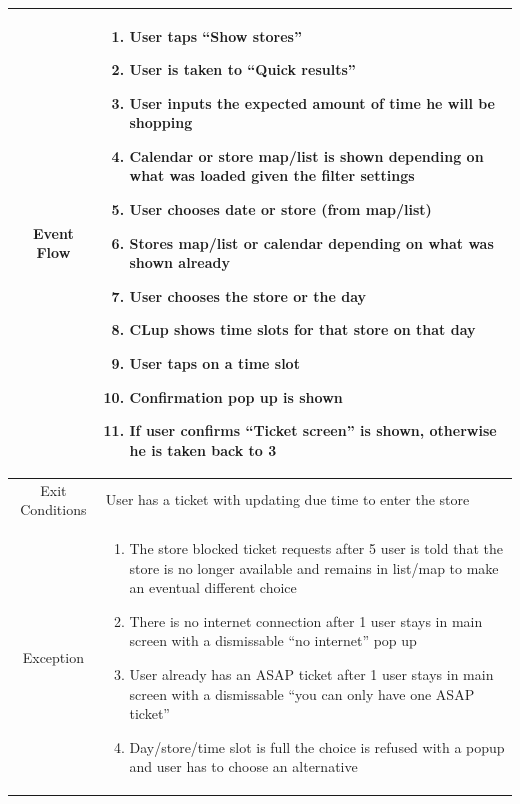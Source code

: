 \begin{enumerate}
\begin{table}[H]
{\begin{tabular}{|c|p{14cm}|}
		Event Flow & \begin{enumerate}
			\item User taps “Show stores”
			\item User is taken to “Quick results”
			\item User inputs the expected amount of time he will be shopping
			\item Calendar or store map/list is shown depending on what was loaded given the filter settings
			\item User chooses date or store (from map/list) 
			\item Stores map/list or calendar depending on what was shown already
			\item User chooses the store or the day
			\item CLup shows time slots for that store on that day
			\item User taps on a time slot
			\item Confirmation pop up is shown
			\item If user confirms “Ticket screen” is shown, otherwise he is taken back to 3			
		\end{enumerate}\\
		
		\hline
		Exit Conditions & User has a ticket with updating due time to enter the store\\
		\hline
		
		Exception & \begin{enumerate}
			\item The store blocked ticket requests\newline
			after 5 user is told that the store is no longer available and remains in list/map to make an eventual different choice
			
			\item There is no internet connection\newline
			after 1 user stays in main screen with a dismissable “no internet” pop up
			
			\item User already has an ASAP ticket\newline
			after 1 user stays in main screen with a dismissable “you can only have one ASAP ticket”
			
			\item Day/store/time slot is full\newline
			the choice is refused with a popup and user has to choose an alternative
			
		\end{enumerate}\\
		

\end{tabular}}
\end{table}
\end{enumerate}
